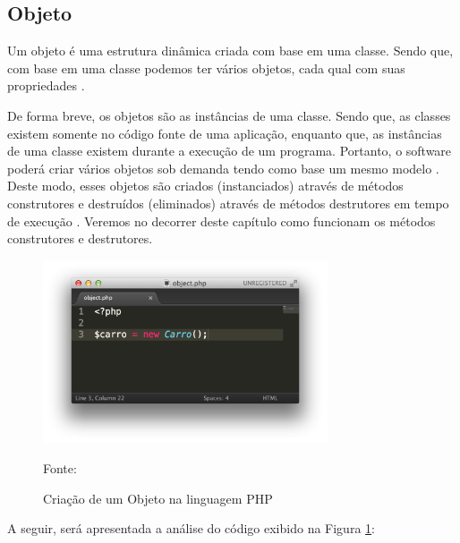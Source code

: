 \subsection{Objeto}

Um objeto é uma estrutura dinâmica criada com base em uma classe. Sendo que,
com base em uma classe podemos ter vários objetos, cada qual com suas
propriedades \cite{phpProgramandoComOrientacaoAObjetos}.

De forma breve, os objetos são as instâncias de uma classe. Sendo que, as
classes existem somente no código fonte de uma aplicação, enquanto que, as
instâncias de uma classe existem durante a execução de um programa. Portanto,
o software poderá criar vários objetos sob demanda tendo como base um mesmo
modelo \cite{ios7ProgrammingFundamentalsObjectiveCXcodeAndCocoaBasics}. Deste
modo, esses objetos são criados (instanciados) através de métodos construtores
e destruídos (eliminados) através de métodos destrutores em tempo de execução
\cite{umlEC++GuiaPraticoDeDesenvolvimentoOrientadoAObjeto}. Veremos no decorrer
deste capítulo como funcionam os métodos construtores e destrutores.

\begin{figure}[h!tb]
	\caption{Criação de um Objeto na linguagem PHP}
	\label{fig:objeto}

	\centering
	\includegraphics[width=0.75\textwidth]{images/object.png}

	\centering
	\footnotesize Fonte: \fonteOAutor
\end{figure}

\FloatBarrier 	%

A seguir, será apresentada a análise do código exibido na
Figura \ref{fig:objeto}:

